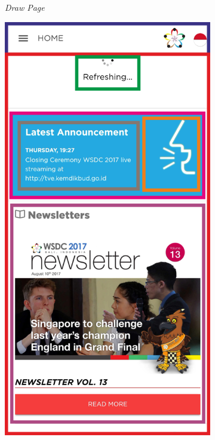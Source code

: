 \begin{figure}[H]
\begin{subfigure}[b]{0.24\textwidth}
	    \caption{\textit{Draw Page}}
	    \label{fig:drawPageWireframe}
     \end{subfigure}
	\begin{subfigure}[b]{0.24\textwidth}
    \centering
	    \includegraphics[scale=0.37]{Gambar/HomePageWireframe.png}

\end{subfigure}
\end{figure}
